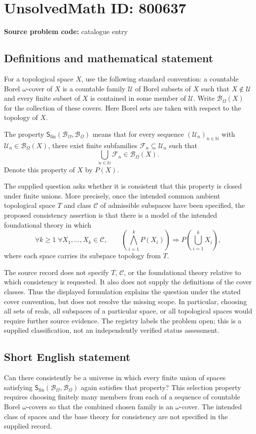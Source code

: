 \documentclass[11pt]{article}
\newcommand{\N}{\mathbb{N}}
\begin{document}
\section*{UnsolvedMath ID: 800637}
\textbf{Source problem code:} catalogue entry
\subsection{Definitions and mathematical statement}
For a topological space \(X\), use the following standard convention: a countable Borel \(\omega\)-cover of \(X\) is a countable family \(\mathcal U\) of Borel subsets of \(X\) such that \(X\notin\mathcal U\) and every finite subset of \(X\) is contained in some member of \(\mathcal U\). Write \(\mathcal B_\Omega(X)\) for the collection of these covers. Here Borel sets are taken with respect to the topology of \(X\).

The property \(\mathsf S_{\mathrm{fin}}(\mathcal B_\Omega,\mathcal B_\Omega)\) means that for every sequence \((\mathcal U_n)_{n\in\N}\) with \(\mathcal U_n\in\mathcal B_\Omega(X)\), there exist finite subfamilies \(\mathcal F_n\subseteq\mathcal U_n\) such that
\[
\bigcup_{n\in\N}\mathcal F_n\in\mathcal B_\Omega(X).
\]
Denote this property of \(X\) by \(P(X)\).

The supplied question asks whether it is consistent that this property is closed under finite unions. More precisely, once the intended common ambient topological space \(T\) and class \(\mathscr C\) of admissible subspaces have been specified, the proposed consistency assertion is that there is a model of the intended foundational theory in which
\[
\forall k\geq 1\;\forall X_1,\ldots,X_k\in\mathscr C,\qquad
\left(\bigwedge_{i=1}^{k}P(X_i)\right)
\Longrightarrow
P\!\left(\bigcup_{i=1}^{k}X_i\right),
\]
where each space carries its subspace topology from \(T\).

The source record does not specify \(T\), \(\mathscr C\), or the foundational theory relative to which consistency is requested. It also does not supply the definitions of the cover classes. Thus the displayed formulation explains the question under the stated cover convention, but does not resolve the missing scope. In particular, choosing all sets of reals, all subspaces of a particular space, or all topological spaces would require further source evidence. The registry labels the problem open; this is a supplied classification, not an independently verified status assessment.
\subsection{Short English statement}
Can there consistently be a universe in which every finite union of spaces satisfying \(\mathsf S_{\mathrm{fin}}(\mathcal B_\Omega,\mathcal B_\Omega)\) again satisfies that property? This selection property requires choosing finitely many members from each of a sequence of countable Borel \(\omega\)-covers so that the combined chosen family is an \(\omega\)-cover. The intended class of spaces and the base theory for consistency are not specified in the supplied record.
\end{document}
